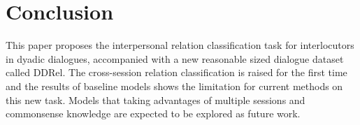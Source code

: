 \documentclass[letterpaper]{article} \usepackage{aaai21}  \usepackage{times}  \usepackage{helvet} \usepackage{courier}  \usepackage[hyphens]{url}  \usepackage{graphicx} \usepackage{xcolor}
\begin{document}
\section{Conclusion}

This paper proposes the interpersonal relation classification task for interlocutors in dyadic dialogues, accompanied with a new reasonable sized dialogue dataset called DDRel. The cross-session relation classification is raised for the first time and the results of baseline models shows the limitation for current methods on this new task. Models that taking advantages of multiple sessions and commonsense knowledge are expected to be explored as future work.
 
 

\end{document}
